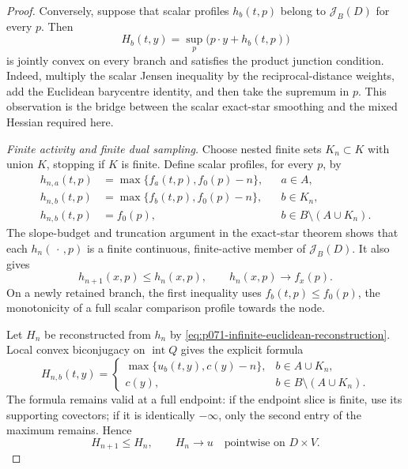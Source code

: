 \begin{proof}
Conversely, suppose that scalar profiles $h_b(t,p)$ belong to
$\mathscr J_B(D)$ for every $p$.  Then
\begin{equation}
 H_b(t,y)=\sup_p\bigl(p\mathbin\cdot y+h_b(t,p)\bigr)
 \label{eq:p071-infinite-euclidean-reconstruction}
\end{equation}
is jointly convex on every branch and satisfies the product junction
condition.  Indeed, multiply the scalar Jensen inequality by the
reciprocal-distance weights, add the Euclidean barycentre identity, and
then take the supremum in $p$.  This observation is the bridge between
the scalar exact-star smoothing and the mixed Hessian required here.

\medskip\noindent
\emph{Finite activity and finite dual sampling.}
Choose nested finite sets $K_n\subset K$ with union $K$, stopping if
$K$ is finite.  Define scalar profiles, for every $p$, by
\begin{align}
 h_{n,a}(t,p)&=\max\{f_a(t,p),f_0(p)-n\}, &&a\in A,
 \label{eq:p071-infinite-euclidean-truncate-a}\\
 h_{n,b}(t,p)&=\max\{f_b(t,p),f_0(p)-n\}, &&b\in K_n,
 \label{eq:p071-infinite-euclidean-truncate-k}\\
 h_{n,b}(t,p)&=f_0(p), &&b\in B\setminus(A\cup K_n).
 \label{eq:p071-infinite-euclidean-truncate-rest}
\end{align}
The slope-budget and truncation argument in the exact-star theorem shows
that each $h_n(\,\cdot\,,p)$ is a finite continuous, finite-active member
of $\mathscr J_B(D)$.  It also gives
\begin{equation}
 h_{n+1}(x,p)\leq h_n(x,p),
 \qquad h_n(x,p)\longrightarrow f_x(p).
 \label{eq:p071-infinite-euclidean-profile-limit}
\end{equation}
On a newly retained branch, the first inequality uses
$f_b(t,p)\leq f_0(p)$, the monotonicity of a full scalar comparison
profile towards the node.

Let $H_n$ be reconstructed from $h_n$ by
\eqref{eq:p071-infinite-euclidean-reconstruction}.  Local convex
biconjugacy on $\operatorname{int}Q$ gives the explicit formula
\begin{equation}
 H_{n,b}(t,y)=
 \begin{cases}
  \max\{u_b(t,y),c(y)-n\},&b\in A\cup K_n,\\
  c(y),&b\in B\setminus(A\cup K_n).
 \end{cases}
 \label{eq:p071-infinite-euclidean-truncated-reconstruction}
\end{equation}
The formula remains valid at a full endpoint: if the endpoint slice is
finite, use its supporting covectors; if it is identically $-\infty$,
only the second entry of the maximum remains.  Hence
\begin{equation}
 H_{n+1}\leq H_n,
 \qquad H_n\longrightarrow u
 \quad\text{pointwise on }D\times V.
 \label{eq:p071-infinite-euclidean-H-limit}
\end{equation}


\end{proof}

